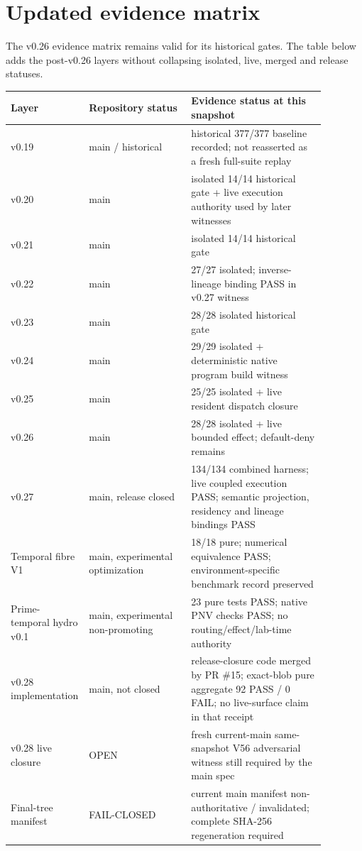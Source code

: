 \chapter{Updated evidence matrix}

The v0.26 evidence matrix remains valid for its historical gates. The table below adds the post-v0.26 layers without collapsing isolated, live, merged and release statuses.

\begin{longtable}{p{0.14\linewidth}p{0.32\linewidth}p{0.42\linewidth}}
\toprule
Layer & Repository status & Evidence status at this snapshot\\\midrule
v0.19 & main / historical & historical 377/377 baseline recorded; not reasserted as a fresh full-suite replay\\
v0.20 & main & isolated 14/14 historical gate + live execution authority used by later witnesses\\
v0.21 & main & isolated 14/14 historical gate\\
v0.22 & main & 27/27 isolated; inverse-lineage binding PASS in v0.27 witness\\
v0.23 & main & 28/28 isolated historical gate\\
v0.24 & main & 29/29 isolated + deterministic native program build witness\\
v0.25 & main & 25/25 isolated + live resident dispatch closure\\
v0.26 & main & 28/28 isolated + live bounded effect; default-deny remains\\
v0.27 & main, release closed & 134/134 combined harness; live coupled execution PASS; semantic projection, residency and lineage bindings PASS\\
Temporal fibre V1 & main, experimental optimization & 18/18 pure; numerical equivalence PASS; environment-specific benchmark record preserved\\
Prime-temporal hydro v0.1 & main, experimental non-promoting & 23 pure tests PASS; native PNV checks PASS; no routing/effect/lab-time authority\\
v0.28 implementation & main, not closed & release-closure code merged by PR \#15; exact-blob pure aggregate 92 PASS / 0 FAIL; no live-surface claim in that receipt\\
v0.28 live closure & OPEN & fresh current-main same-snapshot V56 adversarial witness still required by the main spec\\
Final-tree manifest & FAIL-CLOSED & current main manifest non-authoritative / invalidated; complete SHA-256 regeneration required\\
\bottomrule
\end{longtable}

